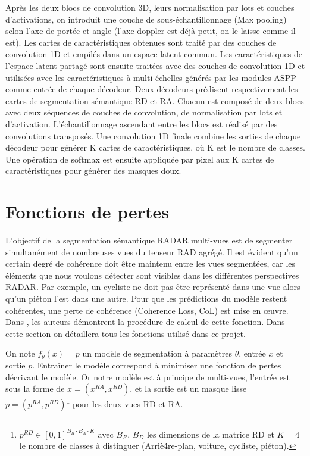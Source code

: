 Après les deux blocs de convolution 3D, leurs normalisation par lots et couches d'activations, on introduit une couche de sous-échantillonnage (Max pooling) selon l'axe de portée et angle (l'axe doppler est déjà petit, on le laisse comme il est). Les cartes de caractéristiques obtenues sont traité par des couches de convolution 1D et empilés dans un espace latent commun. Les caractéristiques de l'espace latent partagé sont ensuite traitées avec des couches de convolution 1D et utilisées avec les caractéristiques à multi-échelles générés par les modules ASPP comme entrée de chaque décodeur. Deux décodeurs prédisent respectivement les cartes de segmentation sémantique RD et RA. Chacun est composé de deux blocs avec deux séquences de couches de convolution, de normalisation par lots et d'activation. L'échantillonnage ascendant entre les blocs est réalisé par des convolutions transposés. Une convolution 1D finale combine les sorties de chaque décodeur pour générer K cartes de caractéristiques, où K est le nombre de classes. Une opération de softmax est ensuite appliquée par pixel aux K cartes de caractéristiques pour générer des masques doux.
\section{Fonctions de pertes}
L'objectif de la segmentation sémantique RADAR multi-vues est de segmenter simultanément de nombreuses vues du tenseur RAD agrégé. Il est évident qu'un certain degré de cohérence doit être maintenu entre les vues segmentées, car les éléments que nous voulons détecter sont visibles dans les différentes perspectives RADAR. Par exemple, un cycliste ne doit pas être représenté dans une vue alors qu'un piéton l'est dans une autre. Pour que les prédictions du modèle restent cohérentes, une perte de cohérence (Coherence Loss, CoL) est mise en œuvre.
Dans \cite{25}, les auteurs démontrent la procédure de calcul de cette fonction. Dans cette section on détaillera tous les fonctions utilisé dans ce projet.

On note $f_\theta (x) = p $ un modèle de segmentation à paramètres $\theta$, entrée $x$ et sortie $p$. Entraîner le modèle correspond à minimiser une fonction de pertes décrivant le modèle. Or notre modèle est à principe de multi-vues, l'entrée est sous la forme de $x=(x^{RA}, x^{RD})$, et la sortie est un masque lisse $p = (p^{RA}, p^{RD})$\footnote{$p^{RD}\in [0,1]^{B_R\cdot B_A\cdot K}$ avec $B_R$, $B_D$ les dimensions de la matrice RD et $K=4$ le nombre de classes à distinguer (Arriè4re-plan, voiture, cycliste, piéton). } pour les deux vues RD et RA. 

